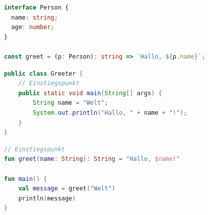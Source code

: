 \begin{lstlisting}[language=TypeScript, caption={TypeScript: typisierte Begrüßung}, label={lst:ts}]
interface Person {
  name: string;
  age: number;
}

const greet = (p: Person): string => `Hallo, ${p.name}`;
\end{lstlisting}

\begin{lstlisting}[language=Java, caption={Java: Hauptklasse}, label={lst:java}]
public class Greeter {
    // Einstiegspunkt
    public static void main(String[] args) {
        String name = "Welt";
        System.out.println("Hallo, " + name + "!");
    }
}
\end{lstlisting}

\begin{lstlisting}[language=Kotlin, caption={Kotlin: Hauptfunktion}, label={lst:kotlin}]
// Einstiegspunkt
fun greet(name: String): String = "Hallo, $name!"

fun main() {
    val message = greet("Welt")
    println(message)
}
\end{lstlisting}

